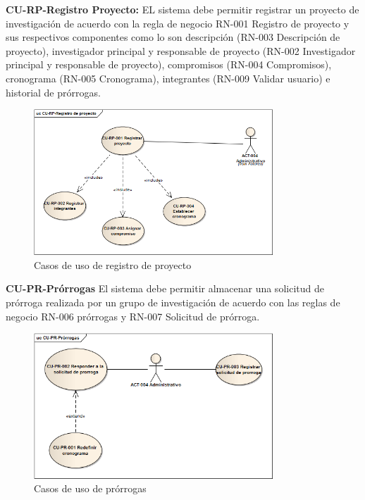 \documentclass[12pt,oneside,letterpaper]{report}
\begin{document}
\textbf{CU-RP-Registro Proyecto:}
EL sistema debe permitir registrar un proyecto de investigación  de acuerdo con la regla de negocio RN-001 Registro de proyecto y sus respectivos componentes como lo son descripción (RN-003 Descripción de proyecto), investigador principal y responsable de proyecto  (RN-002 Investigador principal y responsable de proyecto), compromisos (RN-004 Compromisos), cronograma (RN-005 Cronograma), integrantes (RN-009 Validar usuario) e historial de prórrogas.

\begin{figure}[h!]
  \centering
    \includegraphics[width=0.80\textwidth]{./img/img4.png}
  \caption{Casos de uso de registro de proyecto}
\end{figure}

\textbf{CU-PR-Prórrogas}
El sistema debe permitir almacenar una solicitud de prórroga realizada por un grupo de investigación de acuerdo con las reglas de negocio  RN-006 prórrogas y RN-007 Solicitud de prórroga.

\begin{figure}[h!]
  \centering
    \includegraphics[width=0.80\textwidth]{./img/img5.png}
  \caption{Casos de uso de prórrogas}
\end{figure}
\end{document}
